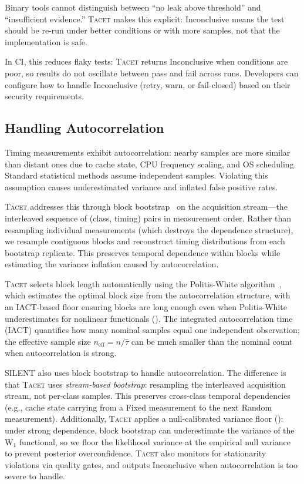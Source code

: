 \documentclass[letterpaper,twocolumn,10pt]{article}
\newcommand{\tacet}{\textsc{Tacet}\xspace}
\newcommand{\silent}{\textsc{SILENT}\xspace}
\begin{document}
Binary tools cannot distinguish between ``no leak above threshold'' and
``insufficient evidence.'' \tacet makes this explicit: Inconclusive means
the test should be re-run under better conditions or with more samples,
not that the implementation is safe.

In CI, this reduces flaky tests: \tacet returns Inconclusive when conditions
are poor, so results do not oscillate between pass and fail across runs.
Developers can configure how to handle Inconclusive (retry, warn, or fail-closed)
based on their security requirements.

\subsection{Handling Autocorrelation}
\label{sec:approach:autocorrelation}

Timing measurements exhibit autocorrelation: nearby samples are more similar than
distant ones due to cache state, CPU frequency scaling, and OS scheduling. Standard
statistical methods assume independent samples. Violating this assumption causes
underestimated variance and inflated false positive rates.

\tacet addresses this through block bootstrap~\cite{blockbootstrap} on the acquisition stream—the
interleaved sequence of (class, timing) pairs in measurement order. Rather than
resampling individual measurements (which destroys the dependence structure),
we resample contiguous blocks and reconstruct timing distributions from each
bootstrap replicate. This preserves temporal dependence within blocks while
estimating the variance inflation caused by autocorrelation.

\tacet selects block length automatically using the Politis-White algorithm~\cite{politiswhite},
which estimates the optimal block size from the autocorrelation structure, with
an IACT-based floor ensuring blocks are long enough even when Politis-White
underestimates for nonlinear functionals (). The integrated
autocorrelation time (IACT) quantifies how many nominal samples equal one
independent observation; the effective sample size $n_{\text{eff}} = n / \hat{\tau}$
can be much smaller than the nominal count when autocorrelation is strong.

\silent also uses block bootstrap to handle autocorrelation. The difference
is that \tacet uses \emph{stream-based bootstrap}: resampling the interleaved
acquisition stream, not per-class samples. This preserves cross-class
temporal dependencies (e.g., cache state carrying from a Fixed measurement to
the next Random measurement). Additionally, \tacet applies a null-calibrated
variance floor (): under strong dependence, block bootstrap
can underestimate the variance of the W$_1$ functional, so we floor the
likelihood variance at the empirical null variance to prevent posterior
overconfidence. \tacet also monitors for
stationarity violations via quality gates, and outputs Inconclusive when
autocorrelation is too severe to handle.
\end{document}
